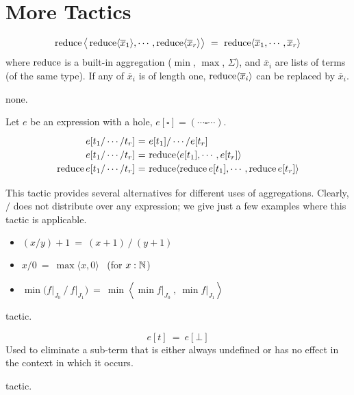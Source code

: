 \section{More Tactics}
\label{more-tactics}

\[\operatorname{reduce}\big\langle \operatorname{reduce}\langle\overline x_1\rangle,\cdots, \operatorname{reduce}\langle\overline x_r\rangle\big\rangle ~=~ \operatorname{reduce} \langle \overline x_1, \cdots, \overline x_r\rangle\]
%
where $\operatorname{reduce}$ is a built-in aggregation ($\min$, $\max$, $\Sigma$), 
and $\overline x_i$ are lists of terms (of the same type).
If any of $\overline x_i$ is of length one, $\operatorname{reduce}\langle\overline x_i\rangle$ can be
replaced by $\overline x_i$.

\Obligations none.

Let $e$ be an expression with a hole, $e[\square] = (\cdots \square \cdots)$.
%
\[\renewcommand\arraystretch{1.2}
  \begin{array}{@{}r@{~}c@{~}l@{}}
    e[t_1/\cdots/t_r] &=& e[t_1] / \cdots / e[t_r] \\
    e[t_1/\cdots/t_r] &=& \reduce\langle e[t_1],\cdots,e[t_r]\rangle \\
    \reduce e[t_1/\cdots/t_r] &=& \reduce\langle \reduce e[t_1],\cdots,\reduce e[t_r]\rangle
  \end{array}\]

This tactic provides several alternatives for different uses of aggregations.
Clearly, $\big/$ does not distribute over any expression; we give just a few examples
where this tactic is applicable.
\begin{itemize}
  \item $(x/y)+1 ~=~ (x+1)~/~(y+1)$
  \item $x/0 ~=~ \max\langle x,0\rangle$ ~(for $x:\mathbb{N}$)
  \item $\min \big(f\big|_{J_0}~\big/~f\big|_{J_1}\big) ~=~
         \min\left\langle \min f\big|_{J_0} ~,~ \min f\big|_{J_1}\right\rangle$
\end{itemize}

\Obligations tactic.

\[e[t] ~=~ e[\bot]\]
%
Used to eliminate a sub-term that is either always undefined or has no effect
in the context in which it occurs.

\Obligations tactic.


